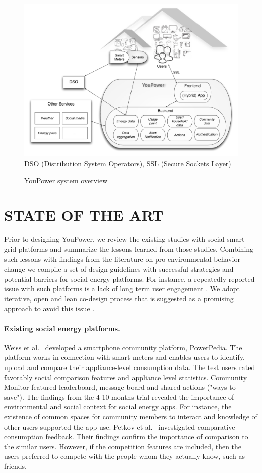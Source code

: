 \begin{figure}[t!]
\begin{center}\footnotesize
	\includegraphics[width=.7\textwidth]{img/civis_platform_overview.pdf}\\
	DSO (Distribution System Operators),  SSL (Secure Sockets Layer)
	\caption{YouPower system overview}\label{fig:platform}
\end{center}
\end{figure}

\section{\uppercase{State of the Art}}

\noindent Prior to designing YouPower, we review the existing studies with social smart grid platforms and summarize the lessons learned from those studies. Combining such lessons with findings from the literature on pro-environmental behavior change we compile a set of design guidelines with successful strategies and potential barriers for social energy platforms. For instance, a repeatedly reported issue with such platforms is a lack of long term user engagement \cite{edward2015review}. We adopt iterative, open and lean co-design process \cite{folstad2008living,klein2013ux} that is suggested as a promising approach to avoid this issue \cite{schwartz2014people}.

\paragraph{Existing social energy platforms.} Weiss et al.~\cite{weiss2012powerpedia} developed a smartphone community platform, PowerPedia. The platform works in connection with smart meters and enables users to identify, upload and compare their appliance-level consumption data. The test users rated favorably social comparison features and appliance level statistics. Community Monitor \cite{dillahunt2014understanding} featured leaderboard, message board and shared actions ("ways to save"). The findings from the 4-10 months trial revealed the importance of environmental and social context for social energy apps. For instance, the existence of common spaces for community members to interact and knowledge of other users supported the app use. Petkov et al.~\cite{petkov2011motivating} investigated comparative consumption feedback. Their findings confirm the importance of comparison to the similar users. However, if the competition features are included, then the users preferred to compete with the people whom they actually know, such as friends.

